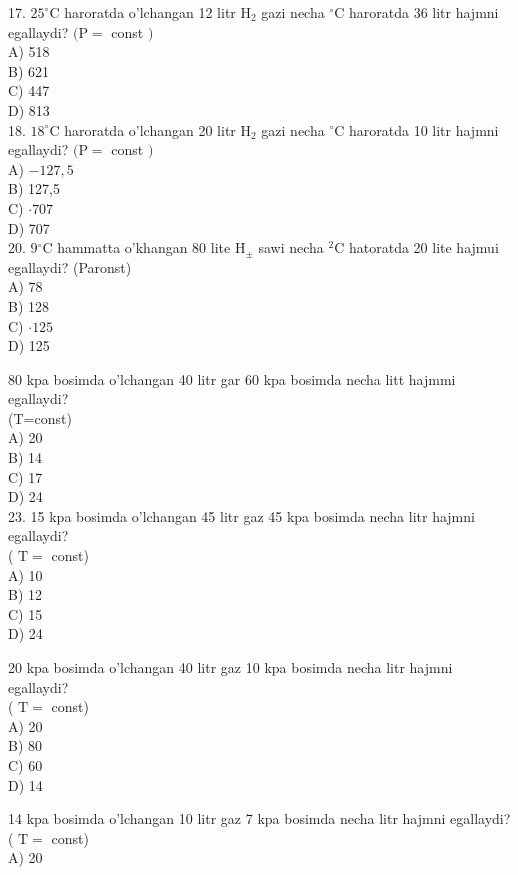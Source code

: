 17. $25^{\circ} \mathrm{C}$ haroratda o'lchangan 12 litr $\mathrm{H}_{2}$ gazi necha ${ }^{\circ} \mathrm{C}$ haroratda 36 litr hajmni egallaydi? $(\mathrm{P}=$ const $)$\\
A) 518\\
B) 621\\
C) 447\\
D) 813\\
18. $18^{\circ} \mathrm{C}$ haroratda o'lchangan 20 litr $\mathrm{H}_{2}$ gazi necha ${ }^{\circ} \mathrm{C}$ haroratda 10 litr hajmni egallaydi? $(\mathrm{P}=$ const $)$\\
A) $-127,5$\\
B) 127,5\\
C) $\cdot 707$\\
D) 707\\
20. $9{ }^{\circ} \mathrm{C}$ hammatta o'khangan 80 lite $\mathrm{H}_{ \pm}$ sawi necha ${ }^{2} \mathrm{C}$ hatoratda 20 lite hajmui egallaydi? (Paronst)\\
A) 78\\
B) 128\\
C) $\cdot 125$\\
D) 125
  \item 80 kpa bosimda o'lchangan 40 litr gar 60 kpa bosimda necha litt hajmmi egallaydi?\\
(T=const)\\
A) 20\\
B) 14\\
C) 17\\
D) 24\\
23. 15 kpa bosimda o'lchangan 45 litr gaz 45 kpa bosimda necha litr hajmni egallaydi?\\
( $\mathrm{T}=$ const)\\
A) 10\\
B) 12\\
C) 15\\
D) 24
  \item 20 kpa bosimda o'lchangan 40 litr gaz 10 kpa bosimda necha litr hajmni egallaydi?\\
( $\mathrm{T}=$ const)\\
A) 20\\
B) 80\\
C) 60\\
D) 14
  \item 14 kpa bosimda o'lchangan 10 litr gaz 7 kpa bosimda necha litr hajmni egallaydi?\\
( $\mathrm{T}=$ const)\\
A) 20\\
